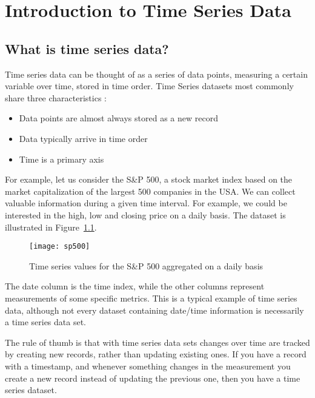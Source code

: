 


\chapter{Introduction to Time Series Data}

\section{What is time series data?}
Time series data can be thought of as a series of data points, measuring a certain variable
over time, stored in time order. Time Series datasets most commonly share three
characteristics \cite{AjayKulkarni2018What} :
\begin{itemize}
	\item Data points are almost always stored as a new record\par
	\item Data typically arrive in time order\par
	\item Time is a primary axis
\end{itemize}

For example, let us consider the S\&P 500, a stock market index based on the market
capitalization of the largest 500 companies in the USA. We can collect valuable information
during a given time interval. For example, we could be interested in the high, low and closing
price on a daily basis. The dataset is illustrated in Figure~\ref{sp500}.

\begin{figure}
\begin{center}
\texttt{[image: sp500]}
\caption[sp500]{Time series values for the S\&P 500 aggregated on a daily basis}
\label{sp500}
\end{center}
\end{figure}

The date column is the time index, while the other columns represent measurements of some
specific metrics. This is a typical example of time series data, although not every dataset
containing date/time information is necessarily a time series data set.

The rule of thumb is that with time series data sets changes over time are tracked by creating
new records, rather than updating existing ones. If you have a record with a timestamp, and
whenever something changes in the measurement you create a new record instead of updating the
previous one, then you have a time series dataset.


